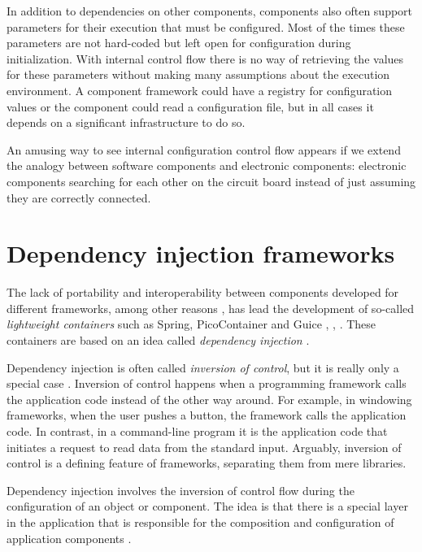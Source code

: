 In addition to dependencies on other components, components also often support parameters for their execution
that must be configured. Most of the times these parameters are not hard-coded but left open for configuration
during initialization. With internal control flow there is no way of retrieving the values for these parameters
without making many assumptions about the execution environment. A component framework could have a registry
for configuration values or the component could read a configuration file, but in all cases it depends on
a significant infrastructure to do so.

An amusing way to see internal configuration control flow appears if we extend the analogy between software components
and electronic components: electronic components searching for each other on the circuit board instead of just assuming
they are correctly connected.

\section{Dependency injection frameworks}

The lack of portability and interoperability between components developed for different frameworks, among other reasons \cite{Dearle},
has lead the development of so-called \emph{lightweight containers} such as Spring, PicoContainer and Guice \cite{Spring},
\cite{PicoContainer}, \cite{Guice}. These containers are based on an idea called \emph{dependency injection} \cite{Fowler2}.

Dependency injection is often called \emph{inversion of control}, but it is really only a special case \cite{Fowler1}.
Inversion of control happens when a programming framework calls the application code instead of the other way around.
For example, in windowing frameworks, when the user pushes a button, the framework calls the application code.
In contrast, in a command-line program it is the application code that initiates a request to read data from the standard input.
Arguably, inversion of control is a defining feature of frameworks, separating them from mere libraries.

Dependency injection involves the inversion of control flow during the configuration of an object or component.
The idea is that there is a special layer in the application that is responsible for the composition and configuration
of application components \cite{Sobernig}.

